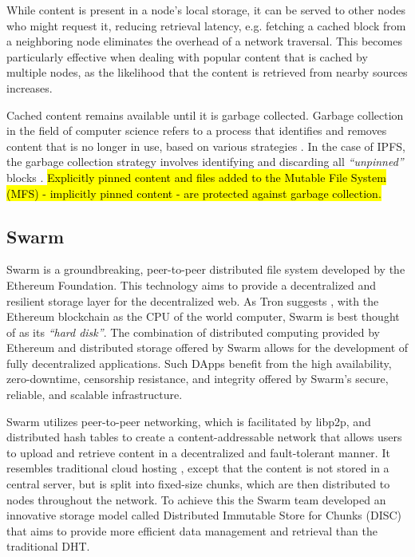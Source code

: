 While content is present in a node's local storage, it can be served to other nodes who might request it, reducing retrieval latency, e.g. fetching a cached block from a neighboring node eliminates the overhead of a network traversal. This becomes particularly effective when dealing with popular content that is cached by multiple nodes, as the likelihood that the content is retrieved from nearby sources increases.

Cached content remains available until it is garbage collected. Garbage collection in the field of computer science refers to a process that identifies and removes content that is no longer in use, based on various strategies \citep{gc_2023}. In the case of IPFS, the garbage collection strategy involves identifying and discarding all \emph{``unpinned''} blocks \citep{ipfs_docs_2}. \hl{Explicitly pinned content and files added to the Mutable File System (MFS) - implicitly pinned content - are protected against garbage collection.}

\subsection{Swarm}\label{subsection:swarm}
Swarm is a groundbreaking, peer-to-peer distributed file system developed by the Ethereum Foundation. This technology aims to provide a decentralized and resilient storage layer for the decentralized web. As Tron suggests \citep{tron_2021}, with the Ethereum blockchain as the CPU of the world computer, Swarm is best thought of as its \emph{``hard disk''}. The combination of distributed computing provided by Ethereum and distributed storage offered by Swarm allows for the development of fully decentralized applications. Such DApps benefit from the high availability, zero-downtime, censorship resistance, and integrity offered by Swarm's secure, reliable, and scalable infrastructure.

Swarm utilizes peer-to-peer networking, which is facilitated by libp2p, and distributed hash tables to create a content-addressable network that allows users to upload and retrieve content in a decentralized and fault-tolerant manner. It resembles traditional cloud hosting \citep{swarmwiki_2019}, except that the content is not stored in a central server, but is split into fixed-size chunks, which are then distributed to nodes throughout the network. To achieve this the Swarm team developed an innovative storage model called Distributed Immutable Store for Chunks (DISC) \citep{swarm_team_2021} that aims to provide more efficient data management and retrieval than the traditional DHT.

